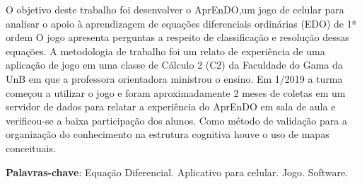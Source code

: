 \begin{resumo}
O objetivo deste trabalho foi desenvolver o AprEnDO,um jogo de celular  para analisar o
 apoio à aprendizagem de equações diferenciais ordinárias (EDO) de 1ª ordem
 O jogo apresenta perguntas a respeito de classificação e resolução dessas equações. A metodologia
 de trabalho foi um relato de experiência de uma aplicação de jogo em uma classe de Cálculo 2 (C2) da Faculdade do Gama da UnB em que a professora orientadora ministrou o ensino. Em 1/2019 a turma começou a utilizar o jogo e foram aproximadamente 2 meses de coletas em um servidor de dados para relatar a experiência do AprEnDO em sala de aula e verificou-se a baixa participação dos alunos. Como método de validação para a organização do conhecimento na estrutura cognitiva houve o uso de mapas conceituais.
	
\begin{comment}
 Com a qualidade de ensino de matemática baixa e contra os métodos muito
 tradicionais de ensino nas salas de aula, resolveu-se desenvolver um 
 aplicativo para celular (iOS e Android) que seja um jogo para o suporte de 
 ensino de equações diferenciais (ED). Será realizada uma pesquisa descritiva
 para o levantamento bibliográfico das características que deverão estar presentes
 no software para dar auxílio a alunos com TDAH junto de técnicas de gamificação 
 para tentar deixar o aprendizado mais prazeroso.
\end{comment}
  
 \begin{comment}
 O resumo deve ressaltar o objetivo, o método, os resultados e as conclusões 
 do documento. A ordem e a extensão
 destes itens dependem do tipo de resumo (informativo ou indicativo) e do
 tratamento que cada item recebe no documento original. O resumo deve ser
 precedido da referência do documento, com exceção do resumo inserido no
 próprio documento. (\ldots) As palavras-chave devem figurar logo abaixo do
 resumo, antecedidas da expressão Palavras-chave:, separadas entre si por
 ponto e finalizadas também por ponto. O texto pode conter no mínimo 150 e 
 no máximo 500 palavras, é aconselhável que sejam utilizadas 200 palavras. 
 E não se separa o texto do resumo em parágrafos.
 \end{comment}

 \vspace{\onelineskip}
    
 \noindent
 \textbf{Palavras-chave}: Equação Diferencial. Aplicativo para celular. Jogo. Software.
\end{resumo}

